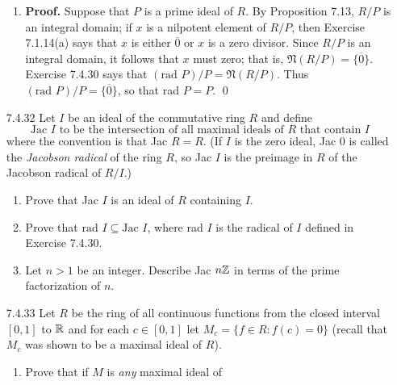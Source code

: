 \begin{enumerate}
      \begin{enumerate}
         \item \textbf{Proof.} Suppose that $P$ is a prime ideal of $R$. By
               Proposition 7.13, $R/P$ is an integral domain; if $x$ is a
               nilpotent element of $R/P$, then Exercise 7.1.14(a) says that
               $x$ is either $\overline{0}$ or $x$ is a zero divisor. Since
               $R/P$ is an integral domain, it follows that $x$ must zero; that 
               is, $\mathfrak{N}(R/P) = \{\overline{0}\}$. Exercise 7.4.30 says 
               that $(\text{rad } P)/P = \mathfrak{N}(R/P)$. Thus
               $(\text{rad } P)/P =  \{\overline{0}\}$, so that rad $P = P$.
               \qed
      \end{enumerate}
   \item[7.4.32]  Let $I$ be an ideal of the commutative ring $R$ and define
                  $$\text{Jac $I$ to be the intersection of all maximal ideals
                     of $R$ that contain $I$}$$
                  where the convention is that Jac $R = R$. (If $I$ is the zero
                  ideal, Jac 0 is called the \textit{Jacobson radical} of the
                  ring $R$, so Jac $I$ is the preimage in $R$ of the Jacobson
                  radical of $R/I$.)
                  \begin{enumerate}
                     \item Prove that Jac $I$ is an ideal of $R$ containing $I$.
                     \item Prove that $\text{rad } I \subseteq \text{Jac }I$,
                           where rad $I$ is the radical of $I$ defined in
                           Exercise 7.4.30.
                     \item Let $n > 1$ be an integer. Describe Jac $n\mathbb{Z}$ in
                           terms of the prime factorization of $n$.
                  \end{enumerate}
   \item[7.4.33]  Let $R$ be the ring of all continuous functions from the
                  closed interval $[0, 1]$ to $\mathbb{R}$ and for each $c \in [0, 1]$
                  let $M_c = \{f \in R : f(c) = 0\}$ (recall that $M_c$ was
                  shown to be a maximal ideal of $R$).
                  \begin{enumerate}
                     \item Prove that if $M$ is \textit{any} maximal ideal of

\end{enumerate}
\end{enumerate}
